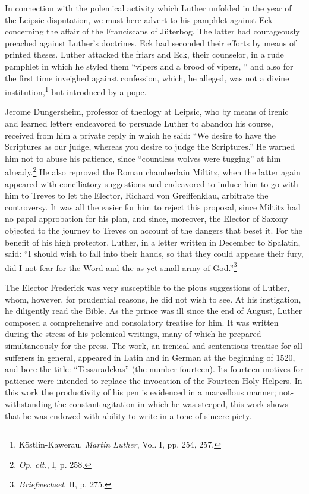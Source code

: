 In connection with the polemical activity which Luther unfolded
in the year of the Leipsic disputation, we must here advert to his
pamphlet against Eck concerning the affair of the Franciscans of
Jüterbog. The latter had courageously preached against Luther’s
doctrines. Eck had seconded their efforts by means of printed theses.
Luther attacked the friars and Eck, their counselor, in a rude pamphlet
in which he styled them “vipers and a brood of vipers, ” and also for
the first time inveighed against confession, which, he alleged, was
not a divine institution,\footnote{Köstlin-Kawerau, \textit{Martin Luther}, Vol. I, pp. 254, 257.}
but introduced by a pope.

Jerome Dungersheim, professor of theology at Leipsic, who by
means of irenic and learned letters endeavored to persuade Luther to
abandon his course, received from him a private reply in which he
said: “We desire to have the Scriptures as our judge, whereas you
desire to judge the Scriptures.” He warned him not to abuse his
patience, since “countless wolves were tugging” at him already.\footnote{\textit{Op. cit.}, I, p. 258.}
He also reproved the Roman chamberlain Miltitz, when the latter
again appeared with conciliatory suggestions and endeavored to induce
him to go with him to Treves to let the Elector, Richard von
Greiffenklau, arbitrate the controversy. It was all the easier for him
to reject this proposal, since Miltitz had no papal approbation for
his plan, and since, moreover, the Elector of Saxony objected to the
journey to Treves on account of the dangers that beset it. For the
benefit of his high protector, Luther, in a letter written in December
to Spalatin, said: “I should wish to fall into their hands, so that
they could appease their fury, did I not fear for the Word and the
as yet small army of God.”\footnote{\textit{Briefwechsel}, II, p. 275.}

The Elector Frederick was very susceptible to the pious suggestions
of Luther, whom, however, for prudential reasons, he did not wish
to see. At his instigation, he diligently read the Bible. As the prince was
ill since the end of August, Luther composed a comprehensive and
consolatory treatise for him. It was written during the stress of his
polemical writings, many of which he prepared simultaneously
for the press. The work, an irenical and sententious treatise for all
sufferers in general, appeared in Latin and in German at the beginning
of 1520, and bore the title: “Tessaradekas” (the number fourteen).
Its fourteen motives for patience were intended to replace
the invocation of the Fourteen Holy Helpers. In this work the
productivity of his pen is evidenced in a marvellous manner;
not-withstanding the constant agitation in which he was steeped, this
work shows that he was endowed with ability to write in a tone of
sincere piety.

